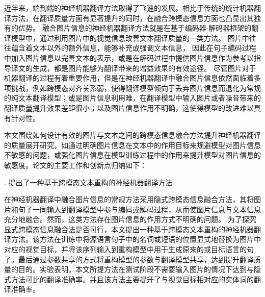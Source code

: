 近年来，端到端的神经机器翻译方法取得了飞速的发展。相比于传统的统计机器翻译方法，在翻译质量方面有显著提升的同时，在融合跨模态信息方面也凸显出其独有的优势。
融合图片信息的神经机器翻译方法就是在基于编码器-解码器框架的翻译模型中，通过利用图片中的视觉信息改善文本翻译质量的一类方法。
图片中往往蕴含着文本以外的额外信息，能够补充或强调文本信息，%
因此在句子编码过程中加入图片信息以完善文本的表示，或是在解码过程中提供图片信息作为参考以指导译文的生成，都是图片能够为翻译带来的增益效果的有效途径。
尽管图片对于机器翻译的过程有着重要作用，但是在神经机器翻译中融合图片信息依然面临着多项挑战，例如跨模态对齐关系弱，使得翻译模型倾向于丢弃图片信息而退化为常规的纯文本翻译模型；或是图片信息利用难，在翻译模型中输入图片或者噪音带来的翻译质量提升效果差距很小；以及图片信息作用不明确，这使得模型的改进难以具有针对性。

本文围绕如何设计有效的图片与文本之间的跨模态信息融合方法提升神经机器翻译的质量展开研究，如通过明确图片信息在文本中的作用目标来规避模型对图片信息不敏感的问题，或强化图片信息在模型训练过程中的作用来提升模型对图片信息的敏感度。论文的主要工作和创新点归纳如下：

{. 提出了一种基于跨模态文本重构的神经机器翻译方法}

在神经机器翻译中融合图片信息的常规方法采用隐式跨模态信息融合方法，其将图片和句子一同输入到翻译模型中参与编码或解码过程，从而使图片信息与文本信息充分地融合。然而，这类方法存在图片信息的作用方式不明确的问题。%
为了探究显式跨模态信息融合法是否可行，本文提出一种基于跨模态文本重构的神经机器翻译方法。该方法在训练中将源语言句子中的名词或短语的位置显式地替换为图片中对应的视觉目标，并将该序列输入到重构模型中用于生成原来的或目标语言的句子。最后通过参数共享的方式将重构模型的参数与翻译模型共享，达到提升翻译质量的目的。实验表明，本文所提方法在测试阶段不需要输入图片的情况下达到与隐式方法可比的翻译准确率。并且该方法主要提升了与视觉目标相对应的实体词的翻译准确率。


